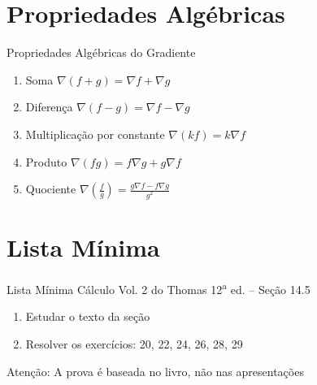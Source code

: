 \documentclass[fleqn,utf8,aspectratio=169,12pt,ignorenonframetext]{beamer}
\begin{document}
\section{Propriedades Algébricas}

\begin{frame}{Propriedades Algébricas do Gradiente}
  \begin{enumerate}[<+->]
    \setlength\itemsep{1.5em}
    \item Soma                        \tabto{55mm} \(\nabla(f+g) = \nabla f + \nabla g\)
    \item Diferença                   \tabto{55mm} \(\nabla(f-g) = \nabla f - \nabla g\)
    \item Multiplicação por constante \tabto{55mm} \(\nabla(kf) = k\nabla f\)
    \item Produto                     \tabto{55mm} \(\nabla(fg) = f\nabla g + g\nabla f\)
    \item Quociente                   \tabto{55mm}
      \(\nabla\left(\frac{f}{g}\right) = \frac{g\nabla f - f\nabla g}{g^2}\)
  \end{enumerate}
\end{frame}



\section{Lista Mínima}

\begin{frame}{Lista Mínima}
  Cálculo Vol. 2 do Thomas 12\textsuperscript{a} ed. -- Seção 14.5
  \begin{enumerate}
    \item Estudar o texto da seção
    \item Resolver os exercícios: 20, 22, 24, 26, 28, 29
  \end{enumerate}

  \vfill
  Atenção: A prova é baseada no livro, não nas apresentações
\end{frame}

\end{document}

